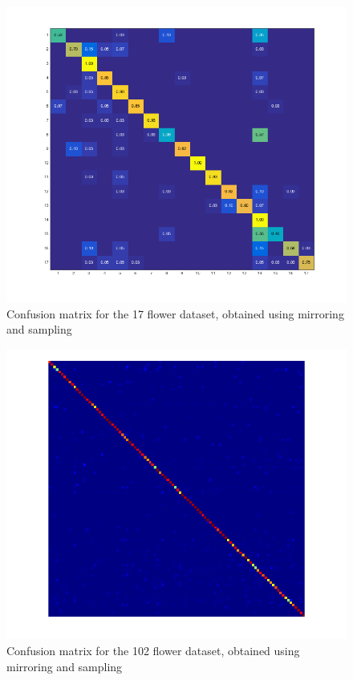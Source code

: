 \documentclass[11pt, a4paper]{report}
\begin{document}
\begin{figure}[hbt]
	\centering
  \includegraphics[totalheight=15cm]{img/15.png}
  \caption{Confusion matrix for the 17 flower dataset, obtained using mirroring and sampling}
  \label{img:15}
\end{figure}

\begin{figure}[hbt]
	\centering
  \includegraphics[totalheight=15cm]{img/16.png}
  \caption{Confusion matrix for the 102 flower dataset, obtained using mirroring and sampling}
  \label{img:16}
\end{figure}
\end{document}

